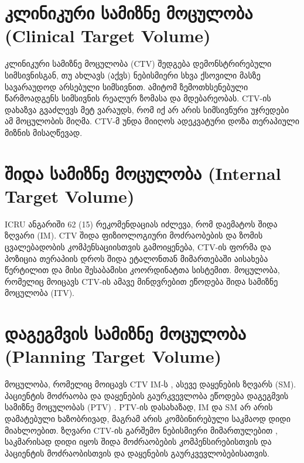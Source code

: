 \documentclass[12pt,a4paper,]{report}
\begin{document}
\section{კლინიკური სამიზნე მოცულობა (Clinical Target Volume)}
კლინიკური სამიზნე მოცულობა (CTV) შედგება დემონსტრირებული სიმსივნისგან, თუ ახლავს (აქვს)  ნებისმიერი სხვა ქსოვილი მასზე სავარაუდოდ არსებული სიმსივნით.  ამიტომ ზემოთხსენებული წარმოადგენს სიმსივნის რეალურ ზომასა და მდებარეობას. CTV-ის დახაზვა გვაძლევს მეტ ვარაუდს,  რომ იქ არ არის სიმსივნური უჯრედები ამ მოცულობის  მიღმა. CTV-მ უნდა მიიღოს ადეკვატური დოზა თერაპიული მიზნის მისაღწევად.

\section{შიდა სამიზნე მოცულობა (Internal Target Volume)}
ICRU ანგარიში 62 (15) რეკომენდაციას იძლევა, რომ დაემატოს შიდა ზღვარი (IM). CTV შიდა ფიზიოლოგიური მოძრაობების და ზომის ცვალებადობის კომპენსაციისთვის  გამოიყენება, CTV-ის ფორმა და პოზიცია თერაპიის დროს შიდა ეტალონთან მიმართებაში  აისახება წერტილით და მისი შესაბამისი კოორდინატთა სისტემით. მოცულობა, რომელიც  მოიცავს CTV-ის ამავე მინდვრებით ეწოდება შიდა სამიზნე მოცულობა (ITV).

\section{დაგეგმვის სამიზნე მოცულობა (Planning Target Volume)}
მოცულობა, რომელიც მოიცავს CTV IM-ს    , ასევე დაყენების ზღვარს (SM). პაციენტის მოძრაობა და დაყენების გაურკვევლობა ეწოდება დაგეგმვის  სამიზნე მოცულობას (PTV) . PTV-ის დასახაზად, IM და SM არ არის დამატებული  ხაზობრივად,  მაგრამ არის კომბინირებული საკმაოდ დიდი მიახლოებით.  ზღვარი CTV-ის გარშემო ნებისმიერი მიმართულებით , საკმარისად დიდი იყოს შიდა მოძრაობების კომპენსირებისთვის და პაციენტის მოძრაობისთვის და დაყენების გაურკვევლობებისათვის.
\end{document}
